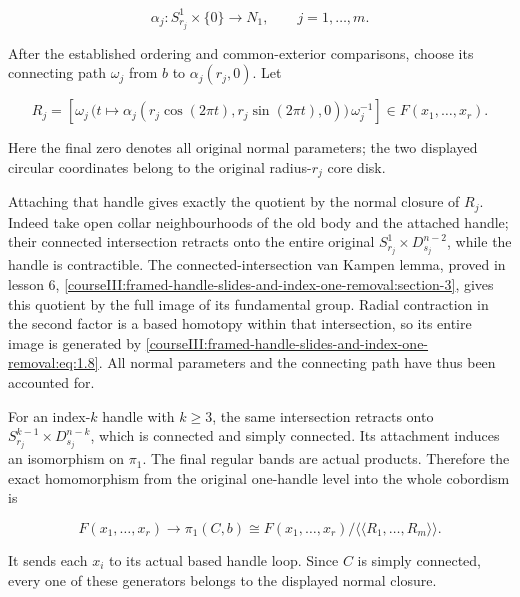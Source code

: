 \begin{equation}
\alpha_j:S^1_{r_j}\times\{0\}\longrightarrow N_1,
 \qquad j=1,\ldots,m.
 \label{courseIII:framed-handle-slides-and-index-one-removal:eq:1.7}
\end{equation}

After the established ordering and common-exterior comparisons, choose its connecting path \(\omega_j\) from \(b\) to \(\alpha_j(r_j,0)\). Let

\begin{equation}
R_j=\left[\omega_j\,
      \bigl(t\mapsto\alpha_j(r_j\cos(2\pi t),r_j\sin(2\pi t),0)\bigr)
      \,\omega_j^{-1}\right]\in F(x_1,\ldots,x_r).
 \label{courseIII:framed-handle-slides-and-index-one-removal:eq:1.8}
\end{equation}

Here the final zero denotes all original normal parameters; the two displayed circular coordinates belong to the original radius-\(r_j\) core disk.

Attaching that handle gives exactly the quotient by the normal closure of \(R_j\). Indeed take open collar neighbourhoods of the old body and the attached handle; their connected intersection retracts onto the entire original \(S^1_{r_j}\times D^{n-2}_{s_j}\), while the handle is contractible. The connected-intersection van Kampen lemma, proved in lesson 6, \cref{courseIII:framed-handle-slides-and-index-one-removal:section-3}, gives this quotient by the full image of its fundamental group. Radial contraction in the second factor is a based homotopy within that intersection, so its entire image is generated by \eqref{courseIII:framed-handle-slides-and-index-one-removal:eq:1.8}. All normal parameters and the connecting path have thus been accounted for.

For an index-\(k\) handle with \(k\geq3\), the same intersection retracts onto \(S^{k-1}_{r_j}\times D^{n-k}_{s_j}\), which is connected and simply connected. Its attachment induces an isomorphism on \(\pi_1\). The final regular bands are actual products. Therefore the exact homomorphism from the original one-handle level into the whole cobordism is

\begin{equation}
F(x_1,\ldots,x_r)\longrightarrow
 \pi_1(C,b)\cong
 F(x_1,\ldots,x_r)/\langle\!\langle R_1,\ldots,R_m\rangle\!\rangle.
 \label{courseIII:framed-handle-slides-and-index-one-removal:eq:1.9}
\end{equation}

It sends each \(x_i\) to its actual based handle loop. Since \(C\) is simply connected, every one of these generators belongs to the displayed normal closure.

